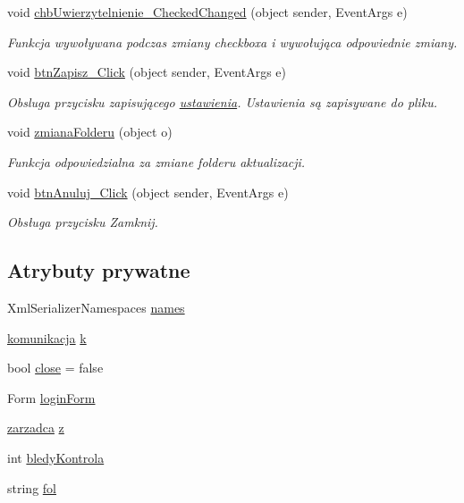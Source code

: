 \begin{CompactItemize}
void \hyperlink{a00014_4d234b74e7e673575fb90c7b41cdd79c}{chbUwierzytelnienie\_\-CheckedChanged} (object sender, EventArgs e)
\begin{CompactList}\small\item\em Funkcja wywoływana podczas zmiany checkboxa i wywołująca odpowiednie zmiany. \item\end{CompactList}\item 
void \hyperlink{a00014_12f013346e6d02fe69877467ca551ef3}{btnZapisz\_\-Click} (object sender, EventArgs e)
\begin{CompactList}\small\item\em Obsluga przycisku zapisującego \hyperlink{a00028}{ustawienia}. Ustawienia są zapisywane do pliku. \item\end{CompactList}\item 
void \hyperlink{a00014_9d2b40a270afe4ddbcc6059e2e6d940b}{zmianaFolderu} (object o)
\begin{CompactList}\small\item\em Funkcja odpowiedzialna za zmiane folderu aktualizacji. \item\end{CompactList}\item 
void \hyperlink{a00014_f95affc14a6ee755996b87db35881a75}{btnAnuluj\_\-Click} (object sender, EventArgs e)
\begin{CompactList}\small\item\em Obsługa przycisku Zamknij. \item\end{CompactList}\end{CompactItemize}
\subsection*{Atrybuty prywatne}
\begin{CompactItemize}
\item 
XmlSerializerNamespaces \hyperlink{a00014_a9ee3b6dc3dc3b9960e784cd32f1cf60}{names}
\item 
\hyperlink{a00013}{komunikacja} \hyperlink{a00014_092fa470ee5f9059cdfda4533edff021}{k}
\item 
bool \hyperlink{a00014_38ea713cadc6819701e3313479fbd000}{close} = false
\item 
Form \hyperlink{a00014_59cabf8f3e48082c0ffa5f7da06fc270}{loginForm}
\item 
\hyperlink{a00037}{zarzadca} \hyperlink{a00014_4a874d85030babce8df85e2dadf9577e}{z}
\item 
int \hyperlink{a00014_3817bb57be51df140314a2da2aa5ba7e}{bledyKontrola}
\item 
string \hyperlink{a00014_e7c5ada1eda848babdd60e4e8c79b819}{fol}
\end{CompactItemize}


